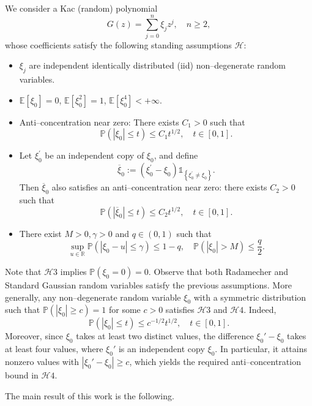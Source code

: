 \documentclass[12pt]{amsart}
\theoremstyle{plain}
\numberwithin{equation}{section}
\renewcommand{\Pr}{\mathbb{P}}
\newcommand{\<}{\langle}
\renewcommand{\>}{\rangle}
\newcommand{\LL}[1]{\left\{#1\right\}}
\newcommand{\R}{\mathds{R}}
\newcommand{\E}[2][ ]{\mathbb{E}{#1}\left[#2\right]}
\newcommand{\abs}[1]{\left|#1\right|}
\renewcommand{\Pr}[1]{\mathds{P}\left(#1\right)}
\begin{document}
We consider a Kac (random) polynomial \[ G(z) =\sum_{j=0}^{n} \xi_j z^j,\quad n\geq 2,\] whose coefficients satisfy the following standing assumptions $\mathcal{H}$:
\begin{itemize}
\item[($\mathcal{H}1$)] $\xi_j$ are independent identically distributed (iid) non--degenerate random variables.
\item[($\mathcal{H}2$)] $\E{\xi_{0}}=0$, $\E{\xi_{0}^2} = 1$, $\E{\xi_{0}^4} < +\infty$.
\item[($\mathcal{H}3$)] Anti--concentration near zero: There exists $C_1>0$ such that \[ \Pr{\abs{\xi_0}\leq t} \leq C_1 t^{1/2},\quad t\in[0,1]. \]
\item[($\mathcal{H}4$)] Let $\xi_0^{'}$ be an independent copy of $\xi_0$, and define \[ \overline{\xi}_0:=(\xi_0^{'}-\xi_0)\mathds{1}_{\LL{\xi_0^{'} \neq \xi_0}}. \] Then $\overline{\xi}_0$ also satisfies an anti--concentration near zero: there exists $C_2>0$ such that \[ \Pr{\abs{\overline{\xi}_0}\leq t} \leq C_2 t^{1/2}, \quad t\in[0,1]. \]
\item[($\mathcal{H}5$)] There exist $M>0,\gamma>0$ and $q\in(0,1)$ such that \[\sup_{u\in\R}\Pr{\abs{\xi_0 - u}\leq \gamma} \leq 1- q, \quad \Pr{\abs{\xi_0}>M} \leq \frac{q}{2}.\]
\end{itemize}
\vspace{1em}
Note that $\mathcal{H}3$ implies $\Pr{\xi_0=0}=0$.  Observe that both Radamecher and Standard Gaussian random variables satisfy the previous assumptions. More generally, any non--degenerate random variable $\xi_0$  with a symmetric distribution such that $\Pr{\abs{\xi_0}\geq c} = 1$ for some $c>0$ satisfies $\mathcal{H}3$ and $\mathcal{H}4$. Indeed, \[\Pr{\abs{\xi_0}\leq t} \leq c^{-1/2} t^{1/2},\quad t\in[0,1].\] Moreover, since $\xi_0$ takes at least two distinct values, the difference $\xi_0'-\xi_0$ takes at least four values, where $\xi_0'$ is an independent copy $\xi_0$. In particular, it attains nonzero values with $\abs{\xi_0'-\xi_0} \geq c$, which yields the required anti--concentration bound in $\mathcal{H}4$.

The main result of this work is the following.
\end{document}
